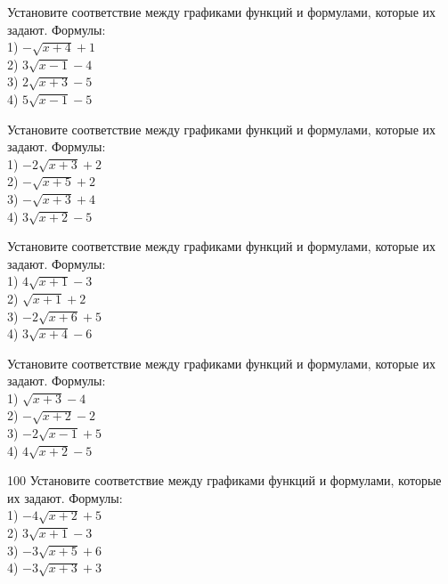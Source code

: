 \documentclass[4apaper]{article}
\begin{document}
\begin{taskBN}{96}
Установите соответствие между графиками функций и формулами, которые их задают. Формулы: \\1) $-\sqrt{x+4}+1$\\2) $3\sqrt{x-1}-4$\\3) $2\sqrt{x+3}-5$\\4) $5\sqrt{x-1}-5$
\end{taskBN}

\begin{taskBN}{97}
Установите соответствие между графиками функций и формулами, которые их задают. Формулы: \\1) $-2\sqrt{x+3}+2$\\2) $-\sqrt{x+5}+2$\\3) $-\sqrt{x+3}+4$\\4) $3\sqrt{x+2}-5$
\end{taskBN}

\begin{taskBN}{98}
Установите соответствие между графиками функций и формулами, которые их задают. Формулы: \\1) $4\sqrt{x+1}-3$\\2) $\sqrt{x+1}+2$\\3) $-2\sqrt{x+6}+5$\\4) $3\sqrt{x+4}-6$
\end{taskBN}

\begin{taskBN}{99}
Установите соответствие между графиками функций и формулами, которые их задают. Формулы: \\1) $\sqrt{x+3}-4$\\2) $-\sqrt{x+2}-2$\\3) $-2\sqrt{x-1}+5$\\4) $4\sqrt{x+2}-5$
\end{taskBN}

\begin{taskBN}{100}
Установите соответствие между графиками функций и формулами, которые их задают. Формулы: \\1) $-4\sqrt{x+2}+5$\\2) $3\sqrt{x+1}-3$\\3) $-3\sqrt{x+5}+6$\\4) $-3\sqrt{x+3}+3$
\end{taskBN}
\end{document}
